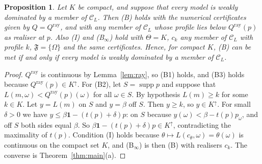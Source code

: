 \documentclass[11pt]{article}
\newtheorem{proposition}[theorem]{Proposition}
\theoremstyle{definition}
\theoremstyle{remark}
\newcommand{\C}{\mathcal C}
\newcommand{\F}{\mathfrak F}
\newcommand{\one}{\mathbf 1}
\newcommand{\supp}{\operatorname{supp}}
\begin{document}
\begin{proposition}\label{prop:necessary}
Let $K$ be compact, and suppose that every model is weakly dominated by a member of $\C_L$. Then (B) holds with the numerical certificates given by $Q=Q^{\mathrm{ray}}$, and with any member of $\C_L$ whose profile lies below $Q^{\mathrm{ray}}(p)$ as realiser at $p$. Also (I) and (B$_\infty$) hold with $\Theta=K$, $c_k$ any member of $\C_L$ with profile $k$, $\F=\{\Omega\}$ and the same certificates. Hence, for compact $K$, (B) can be met if and only if every model is weakly dominated by a member of $\C_L$.
\end{proposition}
\begin{proof}
$Q^{\mathrm{ray}}$ is continuous by Lemma~\ref{lem:ray}, so (B1) holds, and (B3) holds because $Q^{\mathrm{ray}}(p)\in K^\uparrow$. For (B2), let $S=\supp p$ and suppose that $L(m,\omega)<Q^{\mathrm{ray}}(p)(\omega)$ for all $\omega\in S$. By hypothesis $L(m)\ge k$ for some $k\in K$. Let $y=L(m)$ on $S$ and $y=\beta$ off $S$. Then $y\ge k$, so $y\in K^\uparrow$. For small $\delta>0$ we have $y\le \beta\one-(t(p)+\delta)p$: on $S$ because $y(\omega)<\beta-t(p)p_\omega$, and off $S$ both sides equal $\beta$. So $\beta\one-(t(p)+\delta)p\in K^\uparrow$, contradicting the maximality of $t(p)$. Condition (I) holds because $\theta\mapsto L(c_\theta,\omega)=\theta(\omega)$ is continuous on the compact set $K$, and (B$_\infty$) is then (B) with realisers $c_k$. The converse is Theorem~\ref{thm:main}(a).
\end{proof}
\end{document}
